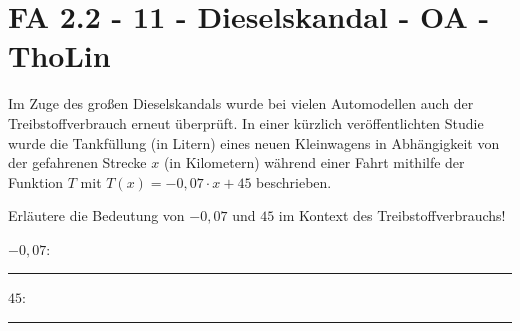 \section{FA 2.2 - 11 - Dieselskandal - OA - ThoLin}

\begin{beispiel}[FA 2.2]{1}

Im Zuge des großen Dieselskandals wurde bei vielen Automodellen auch der Treibstoffverbrauch erneut überprüft. In einer kürzlich veröffentlichten Studie wurde die Tankfüllung (in Litern) eines neuen Kleinwagens in Abhängigkeit von der gefahrenen Strecke $x$ (in Kilometern) während einer Fahrt mithilfe der Funktion $T$ mit $T(x)=-0,07\cdot x+45$ beschrieben. 

Erläutere die Bedeutung von $-0,07$ und $45$ im Kontext des Treibstoffverbrauchs!\leer

$-0,07$: \rule{10cm}{0.3pt}\leer

$45$: \rule{10cm}{0.3pt}

\end{beispiel}